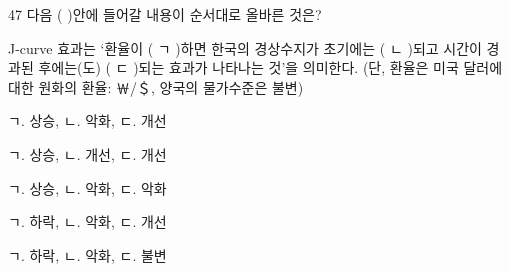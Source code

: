 \begin{question}{47}
다음 ( )안에 들어갈 내용이 순서대로 올바른 것은?
\begin{framedtext}
J-curve 효과는 ‘환율이 ( ㄱ )하면 한국의 경상수지가 초기에는 ( ㄴ )되고 시간이 경과된 후에는(도) ( ㄷ )되는 효과가 나타나는 것’을 의미한다. (단, 환율은 미국 달러에 대한 원화의 환율: ￦/＄, 양국의 물가수준은 불변)
\end{framedtext}
\begin{choices}
  \item ㄱ. 상승, ㄴ. 악화, ㄷ. 개선
  \item ㄱ. 상승, ㄴ. 개선, ㄷ. 개선
  \item ㄱ. 상승, ㄴ. 악화, ㄷ. 악화
  \item ㄱ. 하락, ㄴ. 악화, ㄷ. 개선
  \item ㄱ. 하락, ㄴ. 악화, ㄷ. 불변
\end{choices}
\end{question}
